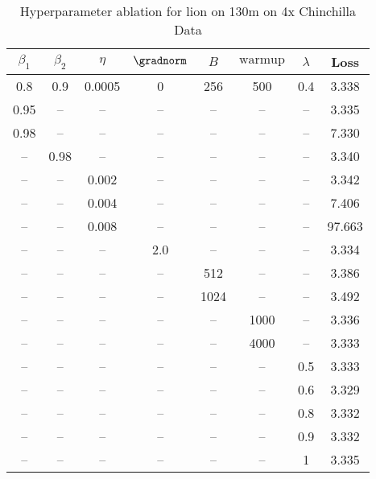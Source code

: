 \begin{table}[h!]
\centering
\caption{Hyperparameter ablation for lion on 130m on 4x Chinchilla Data}
\label{tab:ablation_lion_130m_on_4x_chinchilla_data}
\begin{tabular}{cccccccc}
\toprule
$\beta_1$ & $\beta_2$ & $\eta$ & $\gradnorm$ & $B$ & $\mathrm{warmup}$ & $\lambda$ & Loss \\
\midrule
0.8 & 0.9 & 0.0005 & 0 & 256 & 500 & 0.4 & 3.338 \\
\midrule
0.95 & -- & -- & -- & -- & -- & -- & 3.335 \\
0.98 & -- & -- & -- & -- & -- & -- & 7.330 \\
-- & 0.98 & -- & -- & -- & -- & -- & 3.340 \\
-- & -- & 0.002 & -- & -- & -- & -- & 3.342 \\
-- & -- & 0.004 & -- & -- & -- & -- & 7.406 \\
-- & -- & 0.008 & -- & -- & -- & -- & 97.663 \\
-- & -- & -- & 2.0 & -- & -- & -- & 3.334 \\
-- & -- & -- & -- & 512 & -- & -- & 3.386 \\
-- & -- & -- & -- & 1024 & -- & -- & 3.492 \\
-- & -- & -- & -- & -- & 1000 & -- & 3.336 \\
-- & -- & -- & -- & -- & 4000 & -- & 3.333 \\
-- & -- & -- & -- & -- & -- & 0.5 & 3.333 \\
-- & -- & -- & -- & -- & -- & 0.6 & 3.329 \\
-- & -- & -- & -- & -- & -- & 0.8 & 3.332 \\
-- & -- & -- & -- & -- & -- & 0.9 & 3.332 \\
-- & -- & -- & -- & -- & -- & 1 & 3.335 \\
\bottomrule
\end{tabular}
\end{table}

